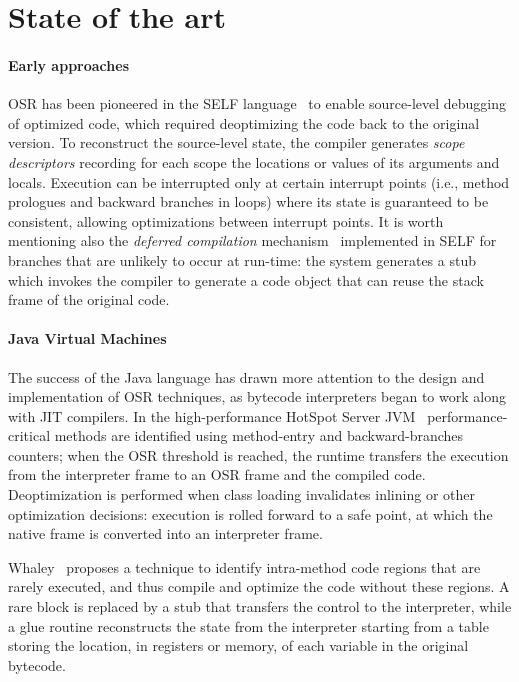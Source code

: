 \section{State of the art}
\label{se:related}

\paragraph{Early approaches}
OSR has been pioneered in the SELF language~\cite{holzle1992self} to enable source-level debugging of optimized code, which required deoptimizing the code back to the original version. To reconstruct the source-level state, the compiler generates {\em scope descriptors} recording for each scope the locations or values of its arguments and locals. Execution can be interrupted only at certain interrupt points (i.e., method prologues and backward branches in loops) where its state is guaranteed to be consistent, allowing optimizations between interrupt points. It is worth mentioning also the {\em deferred compilation} mechanism~\cite{chambers1991self} implemented in SELF for branches that are unlikely to occur at run-time: the system generates a stub which invokes the compiler to generate a code object that can reuse the stack frame of the original code.

\paragraph{Java Virtual Machines}
The success of the Java language has drawn more attention to the design and implementation of OSR techniques, as bytecode interpreters began to work along with JIT compilers. In the high-performance HotSpot Server JVM~\cite{paleczny2001hotspot} performance-critical methods are identified using method-entry and backward-branches counters; when the OSR threshold is reached, the runtime transfers the execution from the interpreter frame to an OSR frame and the compiled code. Deoptimization is performed when class loading invalidates inlining or other optimization decisions: execution is rolled forward to a safe point, at which the native frame is converted into an interpreter frame.

Whaley~\cite{whaley2001osr} proposes a technique to identify intra-method code regions that are rarely executed, and thus compile and optimize the code without these regions. A rare block is replaced by a stub that transfers the control to the interpreter, while a glue routine reconstructs the state from the interpreter starting from a table storing the location, in registers or memory, of each variable in the original bytecode.

